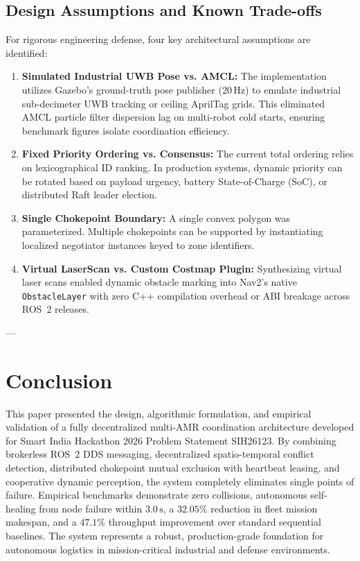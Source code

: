 \documentclass[10pt,twocolumn,a4paper]{article}
\theoremstyle{definition}
\begin{document}
\subsection{Design Assumptions and Known Trade-offs}
For rigorous engineering defense, four key architectural assumptions are identified:
\begin{enumerate}
    \item \textbf{Simulated Industrial UWB Pose vs. AMCL:} The implementation utilizes Gazebo's ground-truth pose publisher ($20\,\text{Hz}$) to emulate industrial sub-decimeter UWB tracking or ceiling AprilTag grids. This eliminated AMCL particle filter dispersion lag on multi-robot cold starts, ensuring benchmark figures isolate coordination efficiency.
    \item \textbf{Fixed Priority Ordering vs. Consensus:} The current total ordering relies on lexicographical ID ranking. In production systems, dynamic priority can be rotated based on payload urgency, battery State-of-Charge (SoC), or distributed Raft leader election.
    \item \textbf{Single Chokepoint Boundary:} A single convex polygon was parameterized. Multiple chokepoints can be supported by instantiating localized negotiator instances keyed to zone identifiers.
    \item \textbf{Virtual LaserScan vs. Custom Costmap Plugin:} Synthesizing virtual laser scans enabled dynamic obstacle marking into Nav2's native \texttt{ObstacleLayer} with zero C++ compilation overhead or ABI breakage across ROS~2 releases.
\end{enumerate}

---

\section{Conclusion}
This paper presented the design, algorithmic formulation, and empirical validation of a fully decentralized multi-AMR coordination architecture developed for Smart India Hackathon 2026 Problem Statement SIH26123. By combining brokerless ROS~2 DDS messaging, decentralized spatio-temporal conflict detection, distributed chokepoint mutual exclusion with heartbeat leasing, and cooperative dynamic perception, the system completely eliminates single points of failure. Empirical benchmarks demonstrate zero collisions, autonomous self-healing from node failure within $3.0\,\text{s}$, a $32.05\%$ reduction in fleet mission makespan, and a $47.1\%$ throughput improvement over standard sequential baselines. The system represents a robust, production-grade foundation for autonomous logistics in mission-critical industrial and defense environments.
\end{document}
